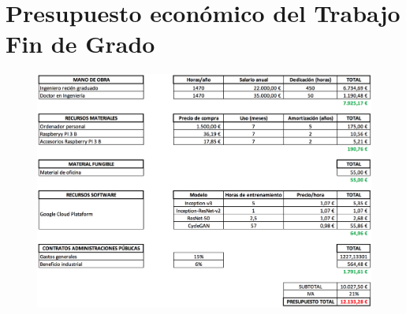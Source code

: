 \chapter{Presupuesto económico del Trabajo Fin de Grado}

\begin{figure}
    \centering
    \includegraphics[width=\textwidth]{Images/economico.png}
\end{figure}

\clearpage
\newpage